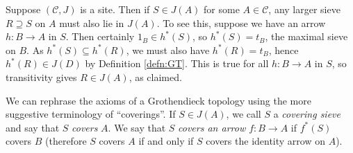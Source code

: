 \documentclass[10pt,oneside]{book}
\def\~#1{\mathscr{#1}}
\theoremstyle{plain}
\theoremstyle{definition}
\theoremstyle{remark}
\numberwithin{equation}{section}
\numberwithin{figure}{section}
\begin{document}
Suppose $(\~C, J)$ is a site. Then if $S \in J(A)$ for some $A \in \~C$, any larger sieve $R \supseteq S$ on $A$ must also lie in $J(A)$. To see this, suppose we have an arrow $h: B \to A$ in $S$. Then certainly $1_B \in h^*(S)$, so $h^*(S) = t_B$, the maximal sieve on $B$. As $h^*(S) \subseteq h^*(R)$, we must also have $h^*(R) = t_B$, hence $h^*(R) \in J(D)$ by Definition \ref{defn:GT}. This is true for all $h: B \to A$ in $S$, so transitivity gives $R \in J(A)$, as claimed.

We can rephrase the axioms of a Grothendieck topology using the more suggestive terminology of ``coverings''. If $S \in J(A)$, we call $S$ a \emph{covering sieve} and say that $S$ \emph{covers} $A$. We say that $S$ \emph{covers an arrow $f: B \to A$} if $f^*(S)$ covers $B$ (therefore $S$ covers $A$ if and only if $S$ covers the identity arrow on $A$).



\printbibliography
\end{document}
